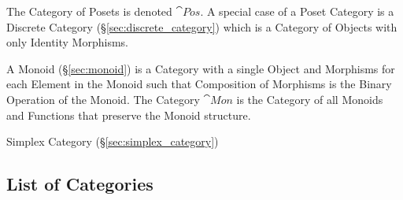The Category of Posets is denoted $\cat{Pos}$. A special case of a
Poset Category is a Discrete Category (\S\ref{sec:discrete_category})
which is a Category of Objects with only Identity Morphisms.

A Monoid (\S\ref{sec:monoid}) is a Category with a single Object and
Morphisms for each Element in the Monoid such that Composition of
Morphisms is the Binary Operation of the Monoid. The Category
$\cat{Mon}$ is the Category of all Monoids and Functions that
preserve the Monoid structure.

Simplex Category (\S\ref{sec:simplex_category})



\subsection{List of Categories}\label{sec:categories_list}

